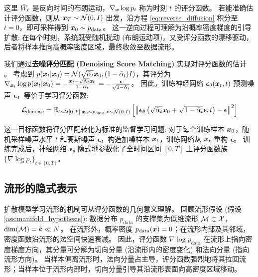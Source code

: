 这里 $\bar{W}_t$ 是反向时间的布朗运动，$\nabla_{\bm{x}} \log p_t$ 称为时刻 $t$ 的评分函数。
若能准确估计评分函数，则从 $\bm{x}_T \sim \mathcal{N}(0, I)$ 出发，沿方程 \eqref{eq:reverse_diffusion} 积分至 $t=0$，即可采样得到 $\bm{x}_0 \sim p_{\text{data}}$。
这一逆向过程可理解为沿概率密度梯度的引导扩散: 在每个时刻，系统既受随机扰动 (布朗运动项)，又受评分函数的漂移驱动，后者将样本推向高概率密度区域，最终收敛至数据流形。

我们通过\textbf{去噪评分匹配 (Denoising Score Matching)} 实现对评分函数的估计 \cite{vincent2011connection}。
考虑到 $p(\bm{x}_t|\bm{x}_0) = \mathcal{N}(\sqrt{\bar{\alpha}_t}\bm{x}_0, (1-\bar{\alpha}_t)I)$，其评分为 $\nabla_{\bm{x}_t} \log p(\bm{x}_t|\bm{x}_0) = -\frac{\bm{x}_t - \sqrt{\bar{\alpha}_t}\bm{x}_0}{1-\bar{\alpha}_t} = -\frac{\bm{\epsilon}}{\sqrt{1-\bar{\alpha}_t}}$。
因此，训练神经网络 $\bm{\epsilon}_\theta(\bm{x}_t, t)$ 预测噪声 $\bm{\epsilon}$，等价于学习评分函数:
\begin{equation}
\label{eq:denoising_loss}
    \mathcal{L}_{\text{denoise}} = \mathbb{E}_{t \sim \mathcal{U}[0,T], \bm{x}_0 \sim p_{\text{data}}, \bm{\epsilon} \sim \mathcal{N}(0,I)}\left[\left\|\bm{\epsilon}_\theta\left(\sqrt{\bar{\alpha}_t}\bm{x}_0 + \sqrt{1-\bar{\alpha}_t}\bm{\epsilon}, t\right) - \bm{\epsilon}\right\|^2\right]
\end{equation}

这一目标函数将评分匹配转化为标准的监督学习问题: 对于每个训练样本 $\bm{x}_0$，随机采样噪声水平 $t$ 和高斯噪声 $\bm{\epsilon}$，构造加噪样本 $\bm{x}_t$，训练网络从 $\bm{x}_t$ 重构 $\bm{\epsilon}$。
训练完成后，神经网络 $\bm{\epsilon}_\theta$ 隐式地参数化了全时间区间 $[0,T]$ 上评分函数族 $\{\nabla \log p_t\}_{t \in [0,T]}$。

\subsection{流形的隐式表示}

扩散模型学习流形的机制可从评分函数的几何意义理解。
回顾流形假设 (假设 \ref{ass:manifold_hypothesis}): 数据分布 $p_{\text{data}}$ 的支撑集为低维流形 $\mathcal{M} \subset \mathcal{X}$，$\dim(\mathcal{M}) = k \ll N$。
在流形外，概率密度 $p_{\text{data}}(\bm{x}) = 0$；在流形内部及其邻域，密度函数沿流形的法空间快速衰减。
因此，评分函数 $\nabla \log p_{\text{data}}$ 在流形上指向密度梯度方向，其分量可分解为切向分量 (沿流形内的密度变化) 和法向分量 (指向流形方向)。
当样本偏离流形时，法向分量占主导，评分函数强烈地将其拉回流形；当样本位于流形内部时，切向分量引导其沿流形表面向高密度区域移动。


